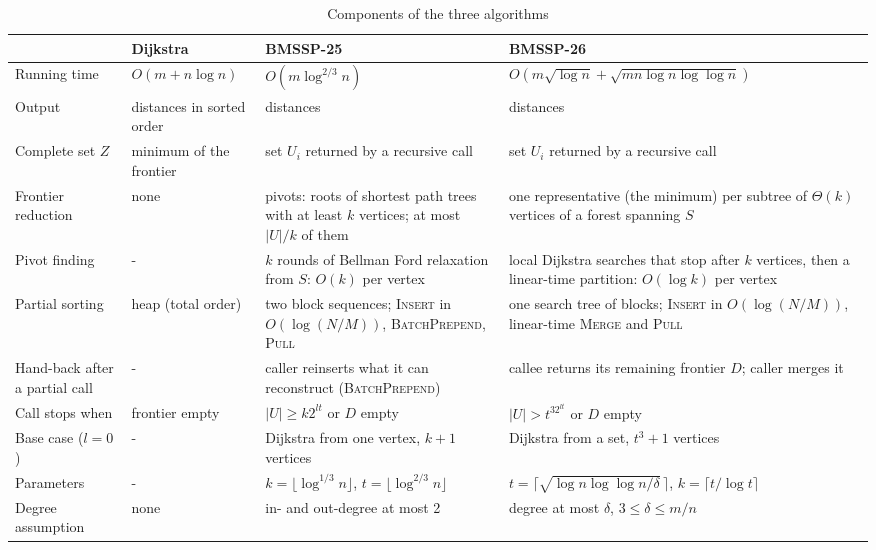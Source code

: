 \documentclass[conference,a4paper]{IEEEtran}
\newcommand{\bmA}{BMSSP-25}
\newcommand{\bmB}{BMSSP-26}
\newcommand{\Oh}{O}
\begin{document}
\begin{table}[t]
\caption{Components of the three algorithms}
\label{tab:theory}
\centering
\renewcommand{\arraystretch}{1.15}
\begin{tabular}{@{}p{2.4cm}p{3.2cm}p{5.4cm}p{5.6cm}@{}}
\hline
 & Dijkstra~\cite{dijkstra1959,fredman1987} & \bmA~\cite{duan2025} & \bmB~\cite{duan2026}\\
\hline
Running time
  & $\Oh(m+n\log n)$
  & $\Oh(m\log^{2/3}n)$
  & $\Oh(m\sqrt{\log n}+\sqrt{mn\log n\log\log n})$\\
Output
  & distances in sorted order
  & distances
  & distances\\
Complete set $Z$
  & minimum of the frontier
  & set $U_i$ returned by a recursive call
  & set $U_i$ returned by a recursive call\\
Frontier reduction
  & none
  & pivots: roots of shortest path trees with at least $k$ vertices; at most $|U|/k$ of
    them
  & one representative (the minimum) per subtree of $\Theta(k)$ vertices of a forest
    spanning $S$\\
Pivot finding
  & -
  & $k$ rounds of Bellman Ford relaxation from $S$: $\Oh(k)$ per vertex
  & local Dijkstra searches that stop after $k$ vertices, then a linear-time partition:
    $\Oh(\log k)$ per vertex\\
Partial sorting
  & heap (total order)
  & two block sequences; \textsc{Insert} in $\Oh(\log(N/M))$, \textsc{BatchPrepend},
    \textsc{Pull}
  & one search tree of blocks; \textsc{Insert} in $\Oh(\log(N/M))$, linear-time
    \textsc{Merge} and \textsc{Pull}\\
Hand-back after a partial call
  & -
  & caller reinserts what it can reconstruct (\textsc{BatchPrepend})
  & callee returns its remaining frontier $D$; caller merges it\\
Call stops when
  & frontier empty
  & $|U|\ge k2^{lt}$ or $D$ empty
  & $|U|>t^32^{lt}$ or $D$ empty\\
Base case ($l=0$)
  & -
  & Dijkstra from one vertex, $k+1$ vertices
  & Dijkstra from a set, $t^3+1$ vertices\\
Parameters
  & -
  & $k=\lfloor\log^{1/3}n\rfloor$, $t=\lfloor\log^{2/3}n\rfloor$
  & $t=\lceil\sqrt{\log n\log\log n/\delta}\,\rceil$, $k=\lceil t/\log t\rceil$\\
Degree assumption
  & none
  & in- and out-degree at most 2
  & degree at most $\delta$, $3\le\delta\le m/n$\\
\hline
\end{tabular}
\end{table}
\end{document}
